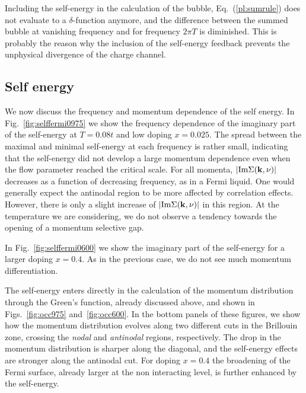 Including the self-energy in the calculation of the bubble,   Eq.~(\ref{pl:sumrule}) does not evaluate to a $\delta$-function anymore, and the difference between the summed bubble at vanishing frequency and for frequency $2\pi T$ is diminished. 
This is probably the reason why the inclusion of the self-energy feedback prevents the unphysical divergence of the charge channel.     


\subsection{Self energy}

We now discuss the frequency and momentum dependence of the self energy. 
In Fig.~\ref{fig:selffermi0975}  we show the frequency dependence of the imaginary part of the self-energy at $T=0.08t$ and low doping $x=0.025$. 
The spread between the maximal and minimal self-energy at each frequency is rather small, indicating that the self-energy did not develop a large momentum dependence even when the flow parameter reached the critical scale. 
For all momenta, $|\mathrm{Im}\Sigma(\mathbf{k},\nu)|$ decreases as a function of decreasing frequency, as in a Fermi liquid. 
One would generally expect the antinodal region to be more affected by correlation effects. However, there is only a slight increase of $|\mathrm{Im}\Sigma(\mathbf{k},\nu)|$ in this region. At the temperature we are considering, we do not observe a tendency towards the opening of a momentum selective gap. 

In Fig.~\ref{fig:selffermi0600} we show the imaginary part of the self-energy for a larger doping $x=0.4$. As in the previous case, we do not see much momentum differentiation.

The self-energy enters directly in the calculation of the momentum distribution through the Green's function, already discussed above, and shown in Figs.~\ref{fig:occ975} and~\ref{fig:occ600}.
In the bottom panels of these figures, we show how the momentum distribution evolves along two different cuts in the Brillouin zone, crossing the \textit{nodal} and \textit{antinodal} regions, respectively.
The drop in the momentum distribution is sharper along the diagonal, and the self-energy effects are stronger along the antinodal cut.
For doping $x=0.4$ the broadening of the Fermi surface, already larger at the non interacting level, is further enhanced by the self-energy.

